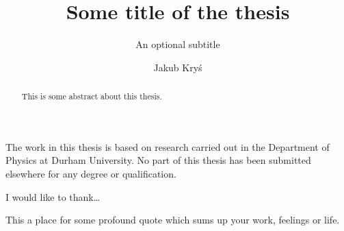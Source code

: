 \documentclass[twoside,openright,frontopenright,halfspacing]{ip3thesis}
\begin{document}
\title{Some title of the thesis}
\subtitle{An optional subtitle}
\author{Jakub Kryś}
\maketitlepage*

\begin{abstract}
%
	This is some abstract about this thesis.
%
\end{abstract}

\disableprotrusion
\tableofcontents*
\listoffigures
\listoftables
\enableprotrusion

\begin{declaration*}
%
	The work in this thesis is based on research carried out in the Department of
	Physics at Durham University. No part of this thesis has been
	submitted elsewhere for any degree or qualification.
%
\end{declaration*}

\begin{acknowledgements*}
%
	I would like to thank\ldots
%
\end{acknowledgements*}

\begin{epigraph*}
%
	This a place for some profound quote which sums up your work, feelings or
	life.
%
\end{epigraph*}


\cleardoublepage


%


\appendix
%
%



\end{document}
